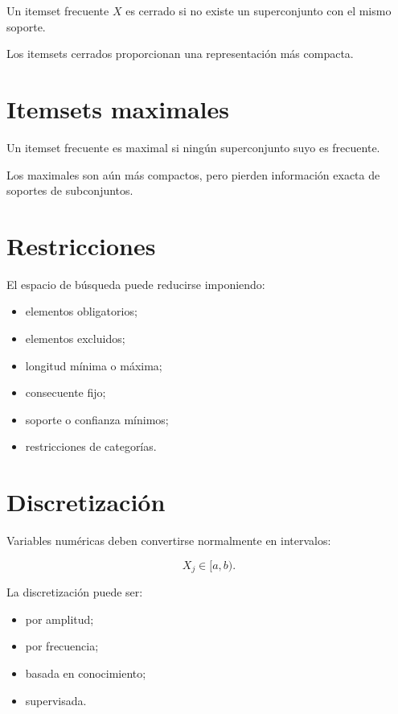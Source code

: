 \documentclass[
  spanish,
  10.5pt,
  letterpaper,
  DIV=11,
  numbers=noendperiod,
  oneside,
  open=any]{scrreprt}
\providecommand{\tightlist}{%
  \setlength{\itemsep}{0pt}\setlength{\parskip}{0pt}}
\theoremstyle{definition}
\theoremstyle{definition}
\theoremstyle{plain}
\theoremstyle{remark}
\begin{document}

Un itemset frecuente \(X\) es cerrado si no existe un superconjunto con
el mismo soporte.

Los itemsets cerrados proporcionan una representación más compacta.

\section*{Itemsets maximales}\label{itemsets-maximales}


Un itemset frecuente es maximal si ningún superconjunto suyo es
frecuente.

Los maximales son aún más compactos, pero pierden información exacta de
soportes de subconjuntos.

\section*{Restricciones}\label{restricciones}


El espacio de búsqueda puede reducirse imponiendo:

\begin{itemize}
\tightlist
\item
  elementos obligatorios;
\item
  elementos excluidos;
\item
  longitud mínima o máxima;
\item
  consecuente fijo;
\item
  soporte o confianza mínimos;
\item
  restricciones de categorías.
\end{itemize}

\section*{Discretización}\label{discretizaciuxf3n}


Variables numéricas deben convertirse normalmente en intervalos:

\[
X_j\in[a,b).
\]

La discretización puede ser:

\begin{itemize}
\tightlist
\item
  por amplitud;
\item
  por frecuencia;
\item
  basada en conocimiento;
\item
  supervisada.
\end{itemize}
\end{document}
